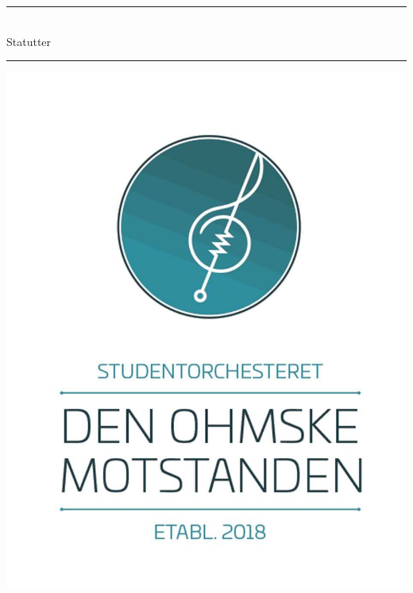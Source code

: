 \documentclass{article}
\begin{document}
%

    \thispagestyle{empty}
        \hfill
        \begin{minipage}{\linewidth}
            \vfill
            \begin{center}
                \rule{\linewidth}{0.1em}\\
                \vspace{0.6\baselineskip}
                {\Huge Statutter}
                \rule{\linewidth}{0.1em}
            \end{center}
            \begin{minipage}{\linewidth}
                \includegraphics[width = \linewidth]{images/MotstandenLogo.jpg}
            \end{minipage}
        \end{minipage}
    \newpage
    
    \tableofcontents
    \newpage

    
\end{document}
